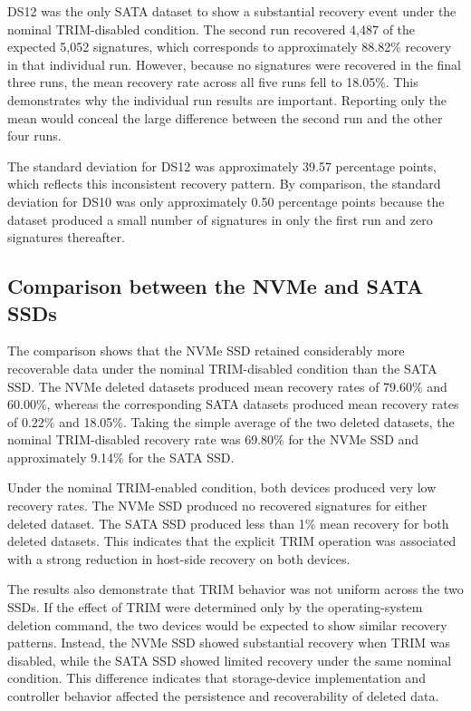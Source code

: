 DS12 was the only SATA dataset to show a substantial recovery event under the nominal TRIM-disabled condition. The second run recovered 4,487 of the expected 5,052 
signatures, which corresponds to approximately 88.82\% recovery in that individual run. However, because no signatures were recovered in the final three runs, the mean
recovery rate across all five runs fell to 18.05\%. This demonstrates why the individual run results are important. Reporting only the mean would conceal the large 
difference between the second run and the other four runs.

The standard deviation for DS12 was approximately 39.57 percentage points, which reflects this inconsistent recovery pattern. By comparison, the standard deviation for 
DS10 was only approximately 0.50 percentage points because the dataset produced a small number of signatures in only the first run and zero signatures thereafter.


\subsection*{Comparison between the NVMe and SATA SSDs}
The comparison shows that the NVMe SSD retained considerably more recoverable data under the nominal TRIM-disabled condition than the SATA SSD. The NVMe deleted 
datasets produced mean recovery rates of 79.60\% and 60.00\%, whereas the corresponding SATA datasets produced mean recovery rates of 0.22\% and 18.05\%. Taking the 
simple average of the two deleted datasets, the nominal TRIM-disabled recovery rate was 69.80\% for the NVMe SSD and approximately 9.14\% for the SATA SSD.

Under the nominal TRIM-enabled condition, both devices produced very low recovery rates. The NVMe SSD produced no recovered signatures for either deleted dataset. The 
SATA SSD produced less than 1\% mean recovery for both deleted datasets. This indicates that the explicit TRIM operation was associated with a strong reduction in 
host-side recovery on both devices.

The results also demonstrate that TRIM behavior was not uniform across the two SSDs. If the effect of TRIM were determined only by the operating-system deletion 
command, the two devices would be expected to show similar recovery patterns. Instead, the NVMe SSD showed substantial recovery when TRIM was disabled, while the SATA 
SSD showed limited recovery under the same nominal condition. This difference indicates that storage-device implementation and controller behavior affected the 
persistence and recoverability of deleted data.


